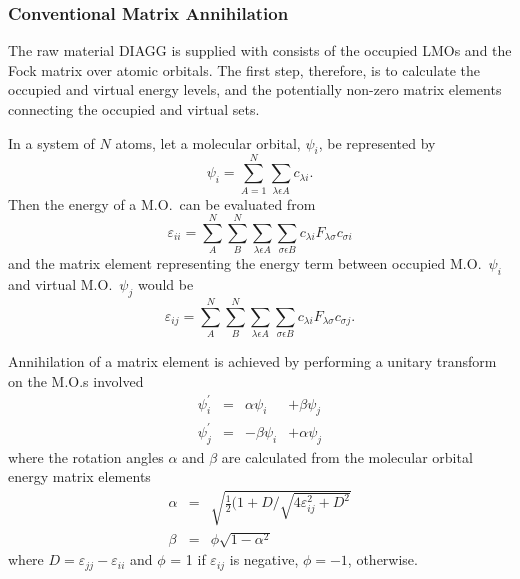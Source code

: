 \subsubsection{Conventional Matrix Annihilation}
The raw material DIAGG is supplied with consists of the occupied LMOs and the
Fock matrix over atomic orbitals.  The first step, therefore, is to calculate
the occupied and virtual energy levels, and the potentially non-zero matrix
elements connecting the occupied and virtual sets.

In a system of $N$ atoms, let a molecular orbital, $\psi_i$, be represented by
\begin{equation}
\psi_i = \sum_{A=1}^N\sum_{\lambda\epsilon A}c_{\lambda i}.
\end{equation}
Then the energy of a M.O.\ can be evaluated from
\begin{equation}
\varepsilon_{ii}=\sum_A^N\sum_B^N\sum_{\lambda\epsilon A}\sum_{\sigma\epsilon B}c_{\lambda i}F_{\lambda\sigma}c_{\sigma i}
\end{equation}
and the matrix element representing the energy term between occupied M.O.\
$\psi_i$ and virtual M.O.\ $\psi_j$ would be 
\begin{equation}
\varepsilon_{i j}=\sum_A^N\sum_B^N\sum_{\lambda\epsilon A}\sum_{\sigma\epsilon B}c_{\lambda  i}F_{\lambda \sigma}c_{\sigma  j}.
\end{equation}

Annihilation of a matrix element  is achieved by performing a unitary 
transform on the M.O.s involved 
\begin{equation}
\begin{array}{llrr}
\psi_i^{'}  & = & \alpha\psi_i & + \beta\psi_j \\
\psi_j^{'}  & = &-\beta\psi_i  & +\alpha\psi_j 
\end{array}
\end{equation}
where the rotation angles $\alpha$ and $\beta$ are calculated from the molecular
orbital energy matrix elements
\begin{equation}
\begin{array}{lll}
\alpha &=& \sqrt{\frac{1}{2}(1+D/\sqrt{4\varepsilon_{i j}^2+D^2}} \\
\beta  &=& \phi\sqrt{1-\alpha^2} 
\end{array}
\end{equation}
where $D= \varepsilon_{j j}-\varepsilon_{i i}$ and $\phi$ = 1 if 
$\varepsilon_{i j}$ is negative, $\phi =-1$, otherwise.

